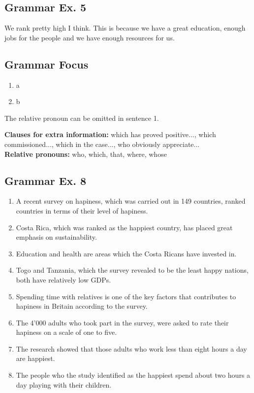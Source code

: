 \documentclass[12pt, a4paper, oneside]{article}
\begin{document}
  \subsection{Grammar Ex. 5}
  We rank pretty high I think. This is because we have a great education, enough jobs for the people and we have enough resources for us.


  \subsection{Grammar Focus}
  \begin{enumerate}[1.]
    \item a
    \item b
  \end{enumerate}

  The relative pronoun can be omitted in sentence 1.

  \textbf{Clauses for extra information:}  which has proved positive..., which commissioned..., which in the case..., who obviously appreciate...\\
  \textbf{Relative pronouns:} who, which, that, where, whose


  \subsection{Grammar Ex. 8}
  \begin{enumerate}[1.]
    \item A recent survey on hapiness, which was carried out in 149 countries, ranked countries in terms of their level of hapiness.
    \item Costa Rica, which was ranked as the happiest country, has placed great emphasis on sustainability.
    \item Education and health are areas which the Costa Ricans have invested in.
    \item Togo and Tanzania, which the survey revealed to be the least happy nations, both have relatively low GDPs.
    \item Spending time with relatives is one of the key factors that contributes to hapiness in Britain according to the survey.
    \item The 4'000 adults who took part in the survey, were asked to rate their hapiness on a scale of one to five.
    \item The research showed that those adults who work less than eight hours a day are happiest.
    \item The people who the study identified as the happiest spend about two hours a day playing with their children.
  \end{enumerate}
\end{document}

